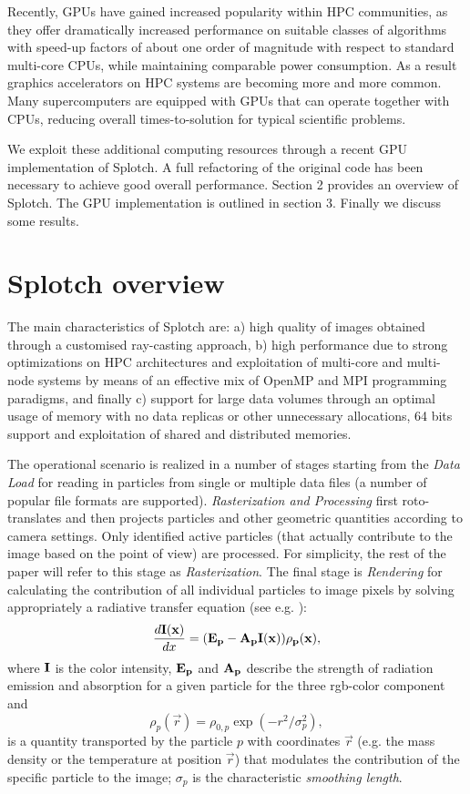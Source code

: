 Recently, GPUs have
gained increased popularity within HPC
communities, as they offer dramatically increased performance on suitable
classes of algorithms with speed-up factors of about one order of magnitude with respect to standard multi-core CPUs, while maintaining comparable power consumption.
As a result graphics accelerators on HPC systems are becoming more and more common. Many supercomputers are equipped with GPUs that can operate together with CPUs, reducing overall times-to-solution
for typical scientific problems.

We exploit these additional computing resources through a recent GPU implementation of Splotch. A full refactoring of the original code has been necessary to achieve good overall performance. Section 2 provides an overview of Splotch. The GPU implementation is outlined in section 3. Finally we discuss some results.

\section{Splotch overview}

The main characteristics of Splotch are: a) high quality of images obtained through a customised ray-casting
approach, b) high performance due to strong optimizations on HPC architectures and exploitation of multi-core and multi-node
systems by means of an effective mix of OpenMP and MPI programming paradigms, and finally c) support for large data volumes through an optimal usage of memory with
no data replicas or other unnecessary allocations, 64 bits support and exploitation
of shared and distributed memories.

The operational scenario is realized in a number of stages  starting from the
{\it Data Load} for reading in particles from single or multiple data files (a number of popular file
formats are supported). {\it Rasterization and Processing}  first roto-translates and then projects particles and other geometric quantities according to camera settings. Only identified active particles 
(that actually contribute to the image based on the point of view)
are processed. For simplicity, the rest
of the paper will refer to this stage as {\it Rasterization}. The final stage is {\it Rendering} for calculating the contribution of all individual particles to image pixels by
solving appropriately a radiative transfer equation (see e.g. \citet{1991par..book.....S}):
\begin{equation}\label{rad}
\frac{d\bf{I}(x)}{dx}=(\bf{E}_p-\bf{A}_p\bf{I}(x))\rho_p(x),
\end{equation}
where $\bf{I}$ is the color intensity, $\bf{E}_p$ and $\bf{A}_p$ 
describe the strength of radiation emission and absorption
for a given particle for the three rgb-color component and 
\begin{equation}\label{smooth}
\rho_p(\vec r)=\rho_{0,p}\exp(-r^2/\sigma_p^2),
\end{equation}
is a quantity transported by the particle $p$ with coordinates $\vec r$
(e.g. the mass density or the temperature at position $\vec r$)
that modulates the contribution of the specific particle to the image; $\sigma_p$
is the characteristic {\it smoothing length}.

